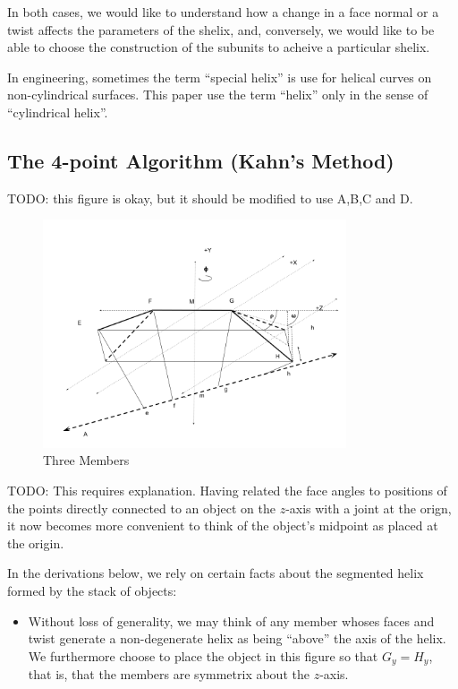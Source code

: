 \documentclass[11pt]{article}
\begin{document}
{In both cases, we would like to understand how a change in a face normal or a twist affects the parameters of the shelix,
and, conversely, we would like to be able to choose the construction of the subunits to acheive a particular shelix.

In engineering, sometimes the term ``special helix''\cite{gu2012research} is use for helical curves on non-cylindrical surfaces. This paper use the term ``helix'' only in the sense of ``cylindrical helix''.


\subsection{The 4-point Algorithm (Kahn's Method)}



TODO: this figure is okay, but it should be modified to use A,B,C and D.

\begin{figure}
     \centering
     \includegraphics[width=0.80\textwidth]{figures/TwoAngleDiagram.png}
     \caption{Three Members}
  \label{fig:threemembersdiagram}
\end{figure}

TODO: This requires explanation.
Having related the face angles to positions of the points directly connected
to an object on the $z$-axis with a joint at the orign, it now becomes more
convenient to think of the object's midpoint as placed at the origin.

In the derivations below, we rely on certain facts about
the segmented helix formed by the stack of objects:
\begin{itemize}
\item Without loss of generality, we may think of any member whoses faces
  and twist generate a non-degenerate helix as being ``above'' the
  axis of the helix. We furthermore choose to place the object in
  this figure so that $G_y = H_y$, that is, that the members are symmetrix
  about the $z$-axis. 
  

\end{itemize}}
\end{document}
